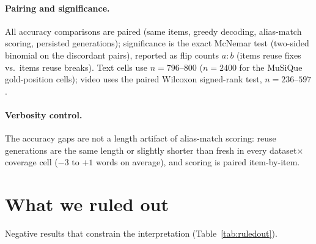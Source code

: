 \documentclass{article} %
\begin{document}
\paragraph{Pairing and significance.}
All accuracy comparisons are paired (same items, greedy decoding, alias-match scoring, persisted generations); significance is the exact McNemar test (two-sided binomial on the discordant pairs), reported as flip counts $a{:}b$ (items reuse fixes vs.\ items reuse breaks). Text cells use $n=796$--$800$ ($n=2400$ for the MuSiQue gold-position cells); video uses the paired Wilcoxon signed-rank test, $n=236$--$597$.

\paragraph{Verbosity control.}
The accuracy gaps are not a length artifact of alias-match scoring: reuse generations are the same length or slightly shorter than fresh in every dataset$\times$coverage cell ($-3$ to $+1$ words on average), and scoring is paired item-by-item.

\section{What we ruled out}
\label{app:ruledout}

Negative results that constrain the interpretation (Table~\ref{tab:ruledout}).
\end{document}
